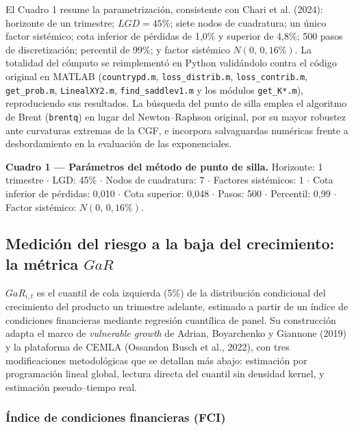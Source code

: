 \documentclass[5p,times,twocolumn,authoryear]{elsarticle}
\begin{document}
El Cuadro 1 resume la parametrización, consistente con Chari et al. (2024): horizonte de un trimestre; $LGD = 45\%$; siete nodos de cuadratura; un único factor sistémico; cota inferior de pérdidas de 1,0\% y superior de 4,8\%; 500 pasos de discretización; percentil de 99\%; y factor sistémico $N(0,\,0{,}16\%)$. La totalidad del cómputo se reimplementó en Python validándolo contra el código original en MATLAB (\texttt{countrypd.m}, \texttt{loss\_distrib.m}, \texttt{loss\_contrib.m}, \texttt{get\_prob.m}, \texttt{LinealXY2.m}, \texttt{find\_saddlev1.m} y los módulos \texttt{get\_K*.m}), reproduciendo sus resultados. La búsqueda del punto de silla emplea el algoritmo de Brent (\texttt{brentq}) en lugar del Newton–Raphson original, por su mayor robustez ante curvaturas extremas de la CGF, e incorpora salvaguardas numéricas frente a desbordamiento en la evaluación de las exponenciales.

\vspace{1em}
\noindent \textbf{Cuadro 1 — Parámetros del método de punto de silla.} Horizonte: 1 trimestre $\cdot$ LGD: 45\% $\cdot$ Nodos de cuadratura: 7 $\cdot$ Factores sistémicos: 1 $\cdot$ Cota inferior de pérdidas: 0,010 $\cdot$ Cota superior: 0,048 $\cdot$ Pasos: 500 $\cdot$ Percentil: 0,99 $\cdot$ Factor sistémico: $N(0,\,0{,}16\%)$.
\vspace{1em}

\subsection{Medición del riesgo a la baja del crecimiento: la métrica $GaR$}

$GaR_{i,t}$ es el cuantil de cola izquierda (5\%) de la distribución condicional del crecimiento del producto un trimestre adelante, estimado a partir de un índice de condiciones financieras mediante regresión cuantílica de panel. Su construcción adapta el marco de \textit{vulnerable growth} de Adrian, Boyarchenko y Giannone (2019) y la plataforma de CEMLA (Ossandon Busch et al., 2022), con tres modificaciones metodológicas que se detallan más abajo: estimación por programación lineal global, lectura directa del cuantil sin densidad kernel, y estimación pseudo–tiempo real.

\subsubsection{Índice de condiciones financieras (FCI)}
\end{document}
